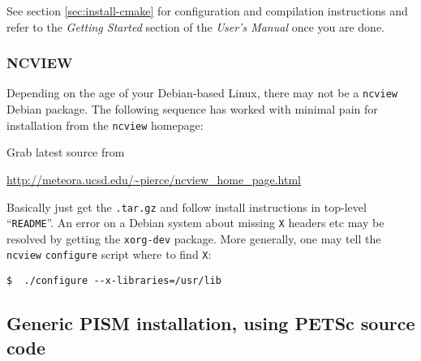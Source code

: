 \documentclass[11pt,final]{amsart}
\begin{document}
See section \ref{sec:install-cmake} for configuration and compilation instructions and refer to the \emph{Getting Started} section
of the \emph{User's Manual} once you are done.

\vspace{0.3in}

\subsubsection*{NCVIEW}  Depending on the age of your Debian-based Linux, there may not be a \texttt{ncview} Debian package.  The following sequence has worked with minimal pain for installation from the \texttt{ncview} homepage:

Grab latest source from
\begin{center}
  \url{http://meteora.ucsd.edu/~pierce/ncview_home_page.html}
\end{center}
Basically just get the \texttt{.tar.gz} and follow install instructions in top-level ``\texttt{README}''.  An error on a Debian system about missing \texttt{X} headers etc may be resolved by getting the \texttt{xorg-dev} package.  More generally, one may tell the \texttt{ncview} \texttt{configure} script where to find \texttt{X}:
\begin{verbatim}
$  ./configure --x-libraries=/usr/lib
\end{verbatim}

\vspace{0.3in}

\newpage
\subsection{Generic PISM installation, using PETSc source code}\label{subsec:generic}
\end{document}
